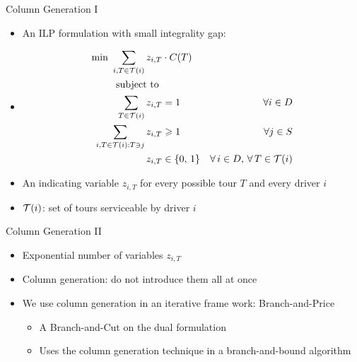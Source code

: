 \documentclass[10pt]{beamer}
\begin{document}
\begin{frame}{Column Generation I}
\begin{itemize}
    \item<1-> An ILP formulation with small integrality gap:
    \item<2->[ ] \begin{align}
        \text {min } \label{cg_obj}	 \sum_{ i, 	T \in \mathcal{T}(i) } z_{i, T} & \cdot C(T) &    &  \\
        \text{subject to }             & & \nonumber  \\
        \label{const:cg1}       \sum_{ T \in \mathcal{T}(i) } z_{ i, T } & = 1  &   \forall i \in D \\
        \label{const:cg2}       \sum_{ i, T \in \mathcal{T}(i): T \ni j } z_{ i, T } & \geqslant 1   &   \forall j \in S \\
        \label{consT:cg3}       z_{ i, T } & \in \{0,\, 1\}    & \forall \, i \in D, \, \forall \, T \in \mathcal{T}(i) 
    \end{align}
    \item<3-> An indicating variable $z_{i, T}$ for every possible \alert{tour} $T$ and every driver $i$
    \item<4-> $\mathcal{T}(i)$: set of tours serviceable by driver $i$
\end{itemize}
\end{frame}

\begin{frame}{Column Generation II}
\begin{itemize}
    \item<1-> Exponential number of variables $z_{i, T}$
    \item<2-> Column generation: do not introduce them all at once
    \item<3-> We use column generation in an iterative frame work: \alert{Branch-and-Price}
    \begin{itemize}
        \item<4-> A \alert{Branch-and-Cut} on the dual formulation
        \item<5-> Uses the column generation technique in a branch-and-bound algorithm
    \end{itemize}
\end{itemize}
\end{frame}
\end{document}
